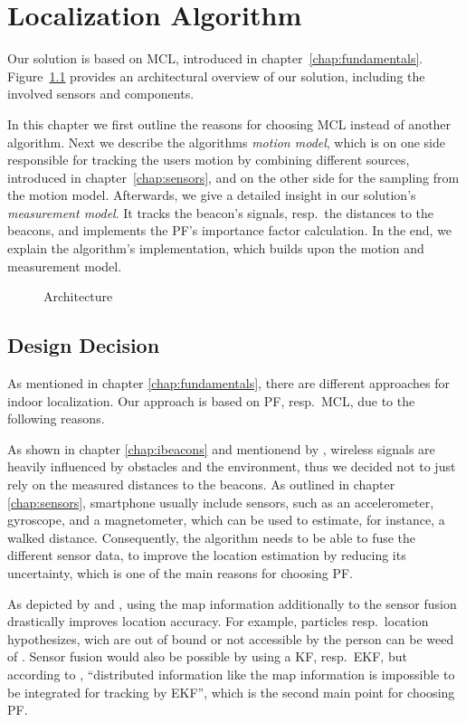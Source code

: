 \chapter{Localization Algorithm} \label{chap:pf}
Our solution is based on \acl{MCL}, introduced in chapter~\ref{chap:fundamentals}. Figure~\ref{fig:algo_architecture} provides an architectural overview of our solution, including the involved sensors and components.

In this chapter we first outline the reasons for choosing \acs{MCL} instead of another algorithm. Next we describe the algorithms \emph{motion model}, which is on one side responsible for tracking the users motion by combining different sources, introduced in chapter~\ref{chap:sensors}, and on the other side for the sampling from the motion model. Afterwards, we give a detailed insight in our solution's \emph{measurement model}. It tracks the beacon's signals, resp.\ the distances to the beacons, and implements the \acs{PF}'s importance factor calculation. In the end, we explain the algorithm's implementation, which builds upon the motion and measurement model.

\begin{figure}
\def\svgwidth{0.9\textwidth}

\caption{Architecture}
\label{fig:algo_architecture}
\end{figure}


\section{Design Decision} \label{sec:algo_decision}
As mentioned in chapter \ref{chap:fundamentals}, there are different approaches for indoor localization. Our approach is based on \acl{PF}, resp.\ \acl{MCL}, due to the following reasons.

As shown in chapter \ref{chap:ibeacons} and mentionend by \citet{IEEE:survey_wireless_indoor_pos}, wireless signals are heavily influenced by obstacles and the environment, thus we decided not to just rely on the measured distances to the beacons. As outlined in chapter \ref{chap:sensors}, smartphone usually include sensors, such as an accelerometer, gyroscope, and a magnetometer, which can be used to estimate, for instance, a walked distance. Consequently, the algorithm needs to be able to fuse the different sensor data, to improve the location estimation by reducing its uncertainty, which is one of the main reasons for choosing \acs{PF}.

As depicted by \citet{siddiqi:experiments_mcl_wifi} and \citet{wang:wlan}, using the map information additionally to the sensor fusion drastically improves location accuracy. For example, particles resp.\ location hypothesizes, wich are out of bound or not accessible by the person can be weed of \citep{straub:pf,siddiqi:experiments_mcl_wifi}. Sensor fusion would also be possible by using a \acl{KF}, resp.\ \acs{EKF}, but according to \citet{wang:wlan}, ``distributed information like the map information is impossible to be integrated for tracking by \acs{EKF}'', which is the second main point for choosing \acs{PF}.

